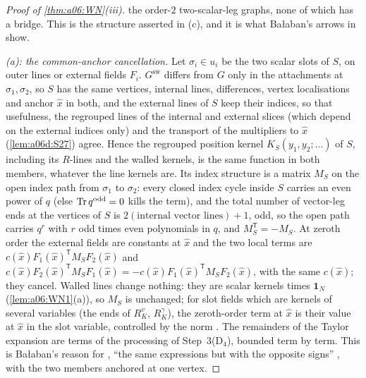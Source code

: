 \begin{proof}[Proof of \cref{thm:a06:WN}\textup{(iii)}]
the order-$2$ two-scalar-leg graphs, none of which has a bridge. This is the structure asserted in (c), and it is what Ba{\l}aban's arrows in \cite[(2.21b)--(g)]{Ba3} show.

\emph{(a): the common-anchor cancellation.} Let $\sigma_i\in u_i$ be the two scalar slots of $S$, on outer lines or external fields $F_i$. $G^{\mathrm{sw}}$ differs from $G$ only in the attachments at $\sigma_1,\sigma_2$, so $S$ has the same vertices, internal lines, differences, vertex localisations and anchor $\hat x$ in both, and the external lines of $S$ keep their indices, so that usefulness, the regrouped lines of the internal and external slices (which depend on the external indices only) and the transport of the multipliers to $\hat x$ (\cref{lem:a06d:S27}) agree. Hence the regrouped position kernel $K_S(y_1,y_2;\dots)$ of $S$, including its $R$-lines and the walled kernels, is the same function in both members, whatever the line kernels are. Its index structure is a matrix $M_S$ on the open index path from $\sigma_1$ to $\sigma_2$: every closed index cycle inside $S$ carries an even power of $q$ (else $\operatorname{Tr} q^{\mathrm{odd}}=0$ kills the term), and the total number of vector-leg ends at the vertices of $S$ is $2(\text{internal vector lines})+1$, odd, so the open path carries $q^{r}$ with $r$ odd times even polynomials in $q$, and $M_S^{\mathsf T}=-M_S$. At zeroth order the external fields are constants at $\hat x$ and the two local terms are $c(\hat x)F_1(\hat x)^{\mathsf T}M_SF_2(\hat x)$ and $c(\hat x)F_2(\hat x)^{\mathsf T}M_SF_1(\hat x)=-c(\hat x)F_1(\hat x)^{\mathsf T}M_SF_2(\hat x)$, with the same $c(\hat x)$; they cancel. Walled lines change nothing: they are scalar kernels times $\mathbf 1_N$ (\cref{lem:a06:WN1}(a)), so $M_S$ is unchanged; for slot fields which are kernels of several variables (the ends of $R^v_K$, $R^\gamma_K$), the zeroth-order term at $\hat x$ is their value at $\hat x$ in the slot variable, controlled by the norm \cite[(1.32)]{Ba3}. The remainders of the Taylor expansion are terms of the processing of Step~3(D$_4$), bounded term by term. This is Ba{\l}aban's reason for \cite[(2.18)]{Ba3}, ``the same expressions but with the opposite signs'' \cite[p.~444]{Ba3}, with the two members anchored at one vertex.


\end{proof}
